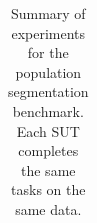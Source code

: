\begin{table}[t]
\begin{center}
{\begin{tabular}{r|llll}
        \end{tabular}
    \caption{Summary of experiments for the population segmentation benchmark. Each \acs{SUT} completes the same tasks on the same data.} 
    \label{Table:cd-experiments}
    }
    \end{center}
\end{table}